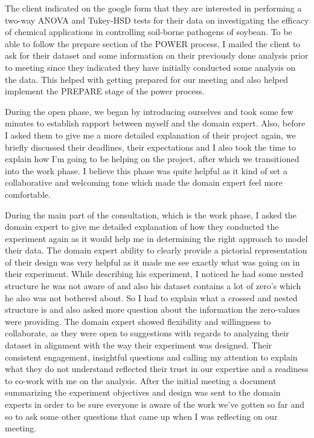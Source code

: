 \documentclass[
  10pt,
  letterpaper,
  twocolumn]{article}
\begin{document}
The client indicated on the google form that they are interested in
performing a two-way ANOVA and Tukey-HSD tests for their data on
investigating the efficacy of chemical applications in controlling
soil-borne pathogens of soybean. To be able to follow the prepare
section of the POWER process, I mailed the client to ask for their
dataset and some information on their previously done analysis prior to
meeting since they indicated they have initially conducted some analysis
on the data. This helped with getting prepared for our meeting and also
helped implement the PREPARE stage of the power process.

During the open phase, we began by introducing ourselves and took some
few minutes to establish rapport between myself and the domain expert.
Also, before I asked them to give me a more detailed explanation of
their project again, we briefly discussed their deadlines, their
expectations and I also took the time to explain how I'm going to be
helping on the project, after which we transitioned into the work phase.
I believe this phase was quite helpful as it kind of set a collaborative
and welcoming tone which made the domain expert feel more comfortable.

During the main part of the consultation, which is the work phase, I
asked the domain expert to give me detailed explanation of how they
conducted the experiment again as it would help me in determining the
right approach to model their data. The domain expert ability to clearly
provide a pictorial representation of their design was very helpful as
it made me see exactly what was going on in their experiment. While
describing his experiment, I noticed he had some nested structure he was
not aware of and also his dataset contains a lot of zero's which he also
was not bothered about. So I had to explain what a crossed and nested
structure is and also asked more question about the information the
zero-values were providing. The domain expert showed flexibility and
willingness to collaborate, as they were open to suggestions with
regards to analyzing their dataset in alignment with the way their
experiment was designed. Their consistent engagement, insightful
questions and calling my attention to explain what they do not
understand reflected their trust in our expertise and a readiness to
co-work with me on the analysis. After the initial meeting a document
summarizing the experiment objectives and design was sent to the domain
experts in order to be sure everyone is aware of the work we've gotten
so far and so to ask some other questions that came up when I was
reflecting on our meeting.
\end{document}
